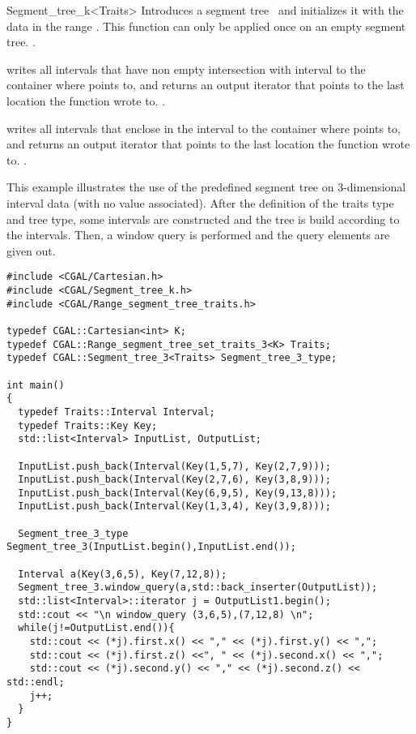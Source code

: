 \begin{ccRefClass}{Segment_tree_k<Traits>}
%
{Introduces a segment tree \ccVar\ and initializes it with the data
in the range \ccc{[first, last)}. This function can only be applied
once on an empty segment tree.
\ccPrecond {}.}


%
{writes all intervals that have non empty intersection with interval  to the container
where  points to, and returns an output iterator that points
to the last location the function wrote to.
\ccPrecond  {}.}

%
{writes all intervals that enclose in the interval  to the container
where  points to, and returns an output iterator that points
to the last location the function wrote to.
\ccPrecond  {}.}


\ccExample

This example illustrates the use of the predefined segment tree
on 3-dimensional interval data (with no value associated). After
the definition of the traits type and tree type, some intervals
are constructed and the tree is build according to the
intervals. Then, a window query is performed and the query
elements are given out.

\begin{verbatim}
#include <CGAL/Cartesian.h>
#include <CGAL/Segment_tree_k.h>
#include <CGAL/Range_segment_tree_traits.h>

typedef CGAL::Cartesian<int> K;
typedef CGAL::Range_segment_tree_set_traits_3<K> Traits;
typedef CGAL::Segment_tree_3<Traits> Segment_tree_3_type;

int main()
{
  typedef Traits::Interval Interval;
  typedef Traits::Key Key;
  std::list<Interval> InputList, OutputList;

  InputList.push_back(Interval(Key(1,5,7), Key(2,7,9)));
  InputList.push_back(Interval(Key(2,7,6), Key(3,8,9)));
  InputList.push_back(Interval(Key(6,9,5), Key(9,13,8)));
  InputList.push_back(Interval(Key(1,3,4), Key(3,9,8)));
 
  Segment_tree_3_type Segment_tree_3(InputList.begin(),InputList.end());

  Interval a(Key(3,6,5), Key(7,12,8));
  Segment_tree_3.window_query(a,std::back_inserter(OutputList));
  std::list<Interval>::iterator j = OutputList1.begin();
  std::cout << "\n window_query (3,6,5),(7,12,8) \n";
  while(j!=OutputList.end()){
    std::cout << (*j).first.x() << "," << (*j).first.y() << ",";
    std::cout << (*j).first.z() <<", " << (*j).second.x() << ",";
    std::cout << (*j).second.y() << "," << (*j).second.z() << std::endl; 
    j++;
  }
}
\end{verbatim}

\end{ccRefClass}
